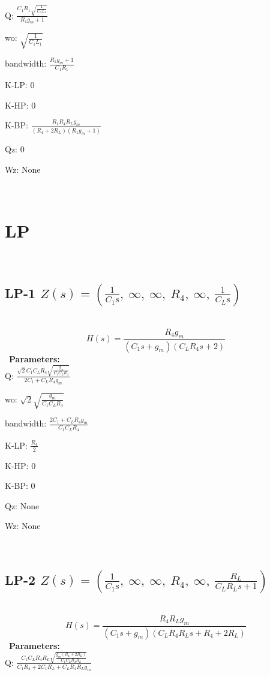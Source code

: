 \documentclass{article}
\begin{document}
Q: $\frac{C_{1} R_{1} \sqrt{\frac{1}{C_{1} L_{1}}}}{R_{1} g_{m} + 1}$\ 

wo: $\sqrt{\frac{1}{C_{1} L_{1}}}$\ 

bandwidth: $\frac{R_{1} g_{m} + 1}{C_{1} R_{1}}$\ 

K-LP: $0$\ 

K-HP: $0$\ 

K-BP: $\frac{R_{1} R_{4} R_{L} g_{m}}{\left(R_{4} + 2 R_{L}\right) \left(R_{1} g_{m} + 1\right)}$\ 

Qz: $0$\ 

Wz: $\text{None}$\ 

\ 

\section{LP}\ 
\subsection{LP-1 $Z(s) = \left( \frac{1}{C_{1} s}, \  \infty, \  \infty, \  R_{4}, \  \infty, \  \frac{1}{C_{L} s}\right)$ } \ 
\textbf{\[H(s) = \frac{R_{4} g_{m}}{\left(C_{1} s + g_{m}\right) \left(C_{L} R_{4} s + 2\right)}\] } \ 
\textbf{Parameters:}\\ 

Q: $\frac{\sqrt{2} C_{1} C_{L} R_{4} \sqrt{\frac{g_{m}}{C_{1} C_{L} R_{4}}}}{2 C_{1} + C_{L} R_{4} g_{m}}$\ 

wo: $\sqrt{2} \sqrt{\frac{g_{m}}{C_{1} C_{L} R_{4}}}$\ 

bandwidth: $\frac{2 C_{1} + C_{L} R_{4} g_{m}}{C_{1} C_{L} R_{4}}$\ 

K-LP: $\frac{R_{4}}{2}$\ 

K-HP: $0$\ 

K-BP: $0$\ 

Qz: $\text{None}$\ 

Wz: $\text{None}$\ 

\ 

\subsection{LP-2 $Z(s) = \left( \frac{1}{C_{1} s}, \  \infty, \  \infty, \  R_{4}, \  \infty, \  \frac{R_{L}}{C_{L} R_{L} s + 1}\right)$ } \ 
\textbf{\[H(s) = \frac{R_{4} R_{L} g_{m}}{\left(C_{1} s + g_{m}\right) \left(C_{L} R_{4} R_{L} s + R_{4} + 2 R_{L}\right)}\] } \ 
\textbf{Parameters:}\\ 

Q: $\frac{C_{1} C_{L} R_{4} R_{L} \sqrt{\frac{g_{m} \left(R_{4} + 2 R_{L}\right)}{C_{1} C_{L} R_{4} R_{L}}}}{C_{1} R_{4} + 2 C_{1} R_{L} + C_{L} R_{4} R_{L} g_{m}}$\ 
\end{document}
